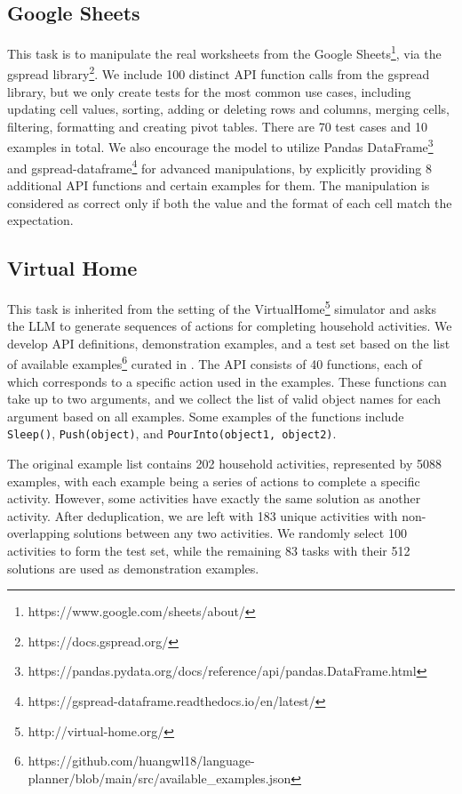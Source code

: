 \subsection{Google Sheets}
This task is to manipulate the real worksheets from the Google Sheets\footnote{https://www.google.com/sheets/about/}, via the gspread library\footnote{https://docs.gspread.org/}. We include 100 distinct API function calls from the gspread library, but we only create tests for the most common use cases, including updating cell values, sorting, adding or deleting rows and columns, merging cells, filtering, formatting and creating pivot tables. There are 70 test cases and 10 examples in total. We also encourage the model to utilize Pandas DataFrame\footnote{https://pandas.pydata.org/docs/reference/api/pandas.DataFrame.html} and gspread-dataframe\footnote{https://gspread-dataframe.readthedocs.io/en/latest/} for advanced manipulations, by explicitly providing 8 additional API functions and certain examples for them. The manipulation is considered as correct only if both the value and the format of each cell match the expectation.

\subsection{Virtual Home}

This task is inherited from the setting of the VirtualHome\footnote{http://virtual-home.org/} simulator and asks the LLM to generate sequences of actions for completing household activities. We develop API definitions, demonstration examples, and a test set based on the list of available examples\footnote{https://github.com/huangwl18/language-planner/blob/main/src/available\_examples.json} curated in \cite{huang2022language}. The API consists of 40 functions, each of which corresponds to a specific action used in the examples. These functions can take up to two arguments, and we collect the list of valid object names for each argument based on all examples. Some examples of the functions include \texttt{Sleep()}, \texttt{Push(object)}, and \texttt{PourInto(object1, object2)}.

The original example list contains 202 household activities, represented by 5088 examples, with each example being a series of actions to complete a specific activity. However, some activities have exactly the same solution as another activity. After deduplication, we are left with 183 unique activities with non-overlapping solutions between any two activities. We randomly select 100 activities to form the test set, while the remaining 83 tasks with their 512 solutions are used as demonstration examples.

